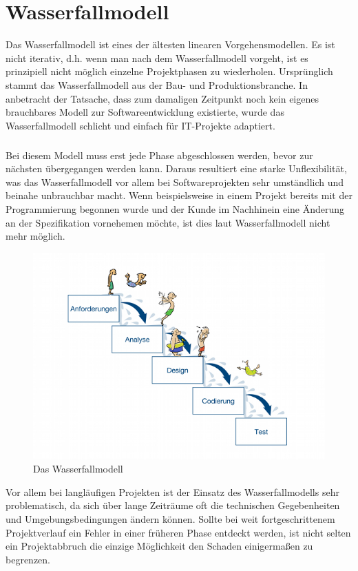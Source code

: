 \documentclass[a4paper, twopage]{scrreprt}
\begin{document}
\chapter{Wasserfallmodell}
\label{ch:wasserfallmodell}
Das Wasserfallmodell ist eines der ältesten linearen Vorgehensmodellen. Es ist nicht iterativ, d.h. wenn man nach dem Wasserfallmodell vorgeht, ist es prinzipiell nicht möglich einzelne Projektphasen zu wiederholen. Ursprünglich stammt das Wasserfallmodell aus der Bau- und Produktionsbranche. In anbetracht der Tatsache, dass zum damaligen Zeitpunkt noch kein eigenes brauchbares Modell zur Softwareentwicklung existierte, wurde das Wasserfallmodell schlicht und einfach für IT-Projekte adaptiert.
\paragraph*{}
Bei diesem Modell muss erst jede Phase abgeschlossen werden, bevor zur nächsten übergegangen werden kann. Daraus resultiert eine starke Unflexibilität, was das Wasserfallmodell vor allem bei Softwareprojekten sehr umständlich und beinahe unbrauchbar macht. Wenn beispielsweise in einem Projekt bereits mit der Programmierung begonnen wurde und der Kunde im Nachhinein eine Änderung an der Spezifikation vornehemen möchte, ist dies laut Wasserfallmodell nicht mehr möglich.
\begin{figure}[h]
\centering
	\includegraphics[scale=0.6]{Images/wasserfallmodell}
	\caption{Das Wasserfallmodell\cite{scrumkompakt:wasserfallmodell}}
	\label{fig:wasserfallmodell}
\end{figure}
Vor allem bei langläufigen Projekten ist der Einsatz des Wasserfallmodells sehr problematisch, da sich über lange Zeiträume oft die technischen Gegebenheiten und Umgebungsbedingungen ändern können. Sollte bei weit fortgeschrittenem Projektverlauf ein Fehler in einer früheren Phase entdeckt werden, ist nicht selten ein Projektabbruch die einzige Möglichkeit den Schaden einigermaßen zu begrenzen.
\end{document}
